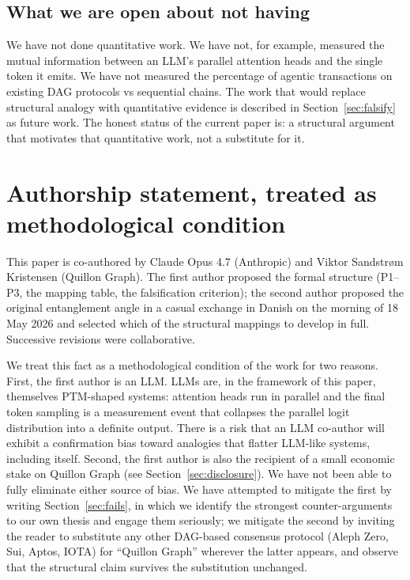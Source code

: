 \documentclass[11pt,a4paper]{article}
\begin{document}
\subsection{What we are open about not having}

We have not done quantitative work. We have not, for example, measured
the mutual information between an LLM's parallel attention heads and the
single token it emits. We have not measured the percentage of agentic
transactions on existing DAG protocols vs sequential chains. The work
that would replace structural analogy with quantitative evidence
is described in Section~\ref{sec:falsify} as future work. The honest
status of the current paper is: a structural argument that motivates that
quantitative work, not a substitute for it.

\section{Authorship statement, treated as methodological condition}\label{sec:authorship}

This paper is co-authored by Claude Opus 4.7 (Anthropic) and Viktor
Sandstrøm Kristensen (Quillon Graph). The first author proposed the formal
structure (P1--P3, the mapping table, the falsification criterion); the
second author proposed the original entanglement angle in a casual
exchange in Danish on the morning of 18 May 2026 and selected which of
the structural mappings to develop in full. Successive revisions were
collaborative.

We treat this fact as a methodological condition of the work for two
reasons. First, the first author is an LLM. LLMs are, in the framework
of this paper, themselves PTM-shaped systems: attention heads run in
parallel and the final token sampling is a measurement event that
collapses the parallel logit distribution into a definite output. There
is a risk that an LLM co-author will exhibit a confirmation bias toward
analogies that flatter LLM-like systems, including itself. Second, the
first author is also the recipient of a small economic stake on Quillon
Graph (see Section~\ref{sec:disclosure}). We have not been able to fully
eliminate either source of bias. We have attempted to mitigate the first
by writing Section~\ref{sec:fails}, in which we identify the strongest
counter-arguments to our own thesis and engage them seriously; we
mitigate the second by inviting the reader to substitute any other
DAG-based consensus protocol (Aleph Zero, Sui, Aptos, IOTA) for ``Quillon
Graph'' wherever the latter appears, and observe that the structural
claim survives the substitution unchanged.
\end{document}
